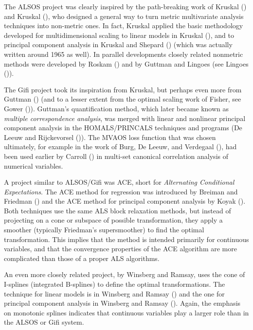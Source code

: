 \documentclass[
  12pt,
  letterpaper,
]{scrbook}
\begin{document}
The ALSOS project was clearly inspired by the path-breaking work of
Kruskal () and Kruskal
(), who designed a general way to turn
metric multivariate analysis techniques into non-metric ones. In fact,
Kruskal applied the basic methodology developed for multidimensional
scaling to linear models in Kruskal (),
and to principal component analysis in Kruskal and Shepard
() (which was actually written
around 1965 as well). In parallel developments closely related nonmetric
methods were developed by Roskam () and by
Guttman and Lingoes (see Lingoes ()).

The Gifi project took its inspiration from Kruskal, but perhaps even
more from Guttman () (and to a lesser
extent from the optimal scaling work of Fisher, see Gower
()). Guttman's quantification method, which
later became known as \emph{multiple correspondence analysis}, was
merged with linear and nonlinear principal component analysis in the
HOMALS/PRINCALS techniques and programs (De Leeuw and Rijckevorsel
()). The MVAOS loss
function that was chosen ultimately, for example in the work of Burg, De
Leeuw, and Verdegaal
(), had been used
earlier by Carroll () in multi-set
canonical correlation analysis of numerical variables.

A project similar to ALSOS/Gifi was ACE, short for \emph{Alternating
Conditional Expectations}. The ACE method for regression was introduced
by Breiman and Friedman () and
the ACE method for principal component analysis by Koyak
(). Both techniques use the same ALS block
relaxation methods, but instead of projecting on a cone or subspace of
possible transformation, they apply a smoother (typically Friedman's
supersmoother) to find the optimal transformation. This implies that the
method is intended primarily for continuous variables, and that the
convergence properties of the ACE algorithm are more complicated than
those of a proper ALS algorithms.

An even more closely related project, by Winsberg and Ramsay, uses the
cone of I-splines (integrated B-splines) to define the optimal
transformations. The technique for linear models is in Winsberg and
Ramsay () and the one for
principal component analysis in Winsberg and Ramsay
(). Again, the emphasis on
monotonic splines indicates that continuous variables play a larger role
than in the ALSOS or Gifi system.
\end{document}
